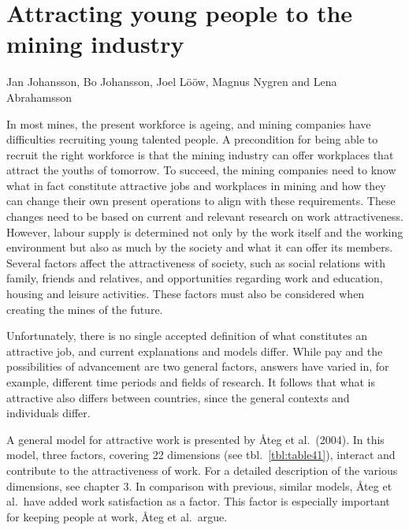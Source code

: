 \documentclass[
  12pt,
]{scrbook}
\newenvironment{chap-auth}
{\vspace{1cm}\begin{center}\begin{flushright}\sffamily\noindent}
  {\end{flushright}\end{center}\vspace{1cm}}
\begin{document}
\hypertarget{attracting-young-people-to-the-mining-industry}{%
\chapter{Attracting young people to the mining industry}\label{attracting-young-people-to-the-mining-industry}}

\begin{chap-auth}
Jan Johansson, Bo Johansson, Joel Lööw, Magnus Nygren and Lena
Abrahamsson
\end{chap-auth}

In most mines, the present workforce is ageing, and mining companies have difficulties recruiting young talented people. A precondition for being able to recruit the right workforce is that the mining industry can offer workplaces that attract the youths of tomorrow. To succeed, the mining companies need to know what in fact constitute attractive jobs and workplaces in mining and how they can change their own present operations to align with these requirements. These changes need to be based on current and relevant research on work attractiveness. However, labour supply is determined not only by the work itself and the working environment but also as much by the society and what it can offer its members. Several factors affect the attractiveness of society, such as social relations with family, friends and relatives, and opportunities regarding work and education, housing and leisure activities. These factors must also be considered when creating the mines of the future.

Unfortunately, there is no single accepted definition of what constitutes an attractive job, and current explanations and models differ. While pay and the possibilities of advancement are two general factors, answers have varied in, for example, different time periods and fields of research. It follows that what is attractive also differs between countries, since the general contexts and individuals differ.

A general model for attractive work is presented by Åteg et al.~(2004). In this model, three factors, covering 22 dimensions (see tbl.~\ref{tbl:table41}), interact and contribute to the attractiveness of work. For a detailed description of the various dimensions, see chapter 3. In comparison with previous, similar models, Åteg et al.~have added work satisfaction as a factor. This factor is especially important for keeping people at work, Åteg et al.~argue.
\end{document}
